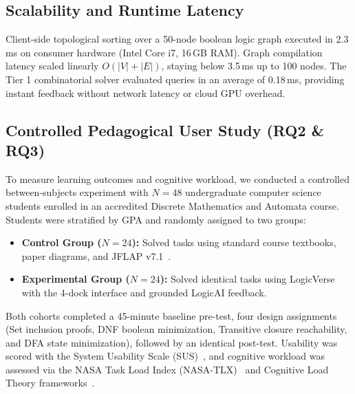 \documentclass[conference]{IEEEtran}
\begin{document}
\subsection{Scalability and Runtime Latency}
Client-side topological sorting over a 50-node boolean logic graph executed in 2.3\,ms on consumer hardware (Intel Core i7, 16\,GB RAM). Graph compilation latency scaled linearly $O(|V| + |E|)$, staying below 3.5\,ms up to 100 nodes. The Tier 1 combinatorial solver evaluated queries in an average of 0.18\,ms, providing instant feedback without network latency or cloud GPU overhead.

\subsection{Controlled Pedagogical User Study (RQ2 \& RQ3)}
To measure learning outcomes and cognitive workload, we conducted a controlled between-subjects experiment with $N = 48$ undergraduate computer science students enrolled in an accredited Discrete Mathematics and Automata course. Students were stratified by GPA and randomly assigned to two groups:
\begin{itemize}
    \item \textbf{Control Group ($N = 24$):} Solved tasks using standard course textbooks, paper diagrams, and JFLAP v7.1~\cite{rodger2006}.
    \item \textbf{Experimental Group ($N = 24$):} Solved identical tasks using LogicVerse with the 4-dock interface and grounded LogicAI feedback.
\end{itemize}

Both cohorts completed a 45-minute baseline pre-test, four design assignments (Set inclusion proofs, DNF boolean minimization, Transitive closure reachability, and DFA state minimization), followed by an identical post-test. Usability was scored with the System Usability Scale (SUS)~\cite{brooke1996}, and cognitive workload was assessed via the NASA Task Load Index (NASA-TLX)~\cite{hart1988} and Cognitive Load Theory frameworks~\cite{sweller2011}.
\end{document}
